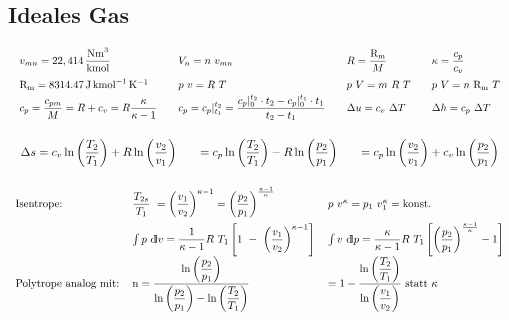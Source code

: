 \subsection{Ideales Gas}
%
	\skipabove{-20pt}
		\[ \arraycolsep=1em  \def\arraystretch{1.7}
		\begin{array}{llll}
			v_{mn}=22,414\, \dfrac{\si{Nm^3}}{\si{\kmol}}          & V_n = n\ v_{mn}                                                                               & R=\dfrac{\mathrm{R_m}}{M}       & \kappa = \dfrac{c_p}{c_v} \\
			\mathrm{R_m} = \qty{8314,47}{\J\per\kmol\per\K}        & p\ v=R\ T                                                                                     & p\ V = m\ R\ T         & p\ V=n\ \mathrm{R_m}\ T            \\
			c_p=\dfrac{c_{pm}}{M}=R+c_v=R \dfrac{\kappa}{\kappa-1} & c_p=c_p|_{t_1}^{t_2}  =   \dfrac{c_p|_{0}^{t_2}\cdot t_2 - c_p|_{0}^{t_1}\cdot t_1}{t_2- t_1} & \Delta u=c_v\ \Delta T & \Delta h=c_p\ \Delta T
		\end{array} \]
%
	\skipabove{-15pt}
		\[ \arraycolsep=1em  \def\arraystretch{2.7}
		\begin{array}{lll}
	  \Delta s = c_v \ln\left( \dfrac{T_2}{T_1}\right) + R \ln\left( \dfrac{v_2}{v_1}\right)
			&  = c_p \ln\left( \dfrac{T_2}{T_1}\right) - R \ln\left( \dfrac{p_2}{p_1}\right)
			&  = c_p \ln\left( \dfrac{v_2}{v_1}\right) + c_v \ln\left( \dfrac{p_2}{p_1}\right)
		\end{array} \]

	\skipabove{-10pt}
		\[ \arraycolsep=0.6em  \def\arraystretch{2.7}
		\begin{array}{lll}
			\text{Isentrope:}
			& \dfrac{T_{2s}}{T_1}\   =  \left(\dfrac{v_1}{v_2}\right)^{\kappa-1}  =
				\left(\dfrac{p_2}{p_1}\right)^\frac{\kappa-1}{\kappa}
			& p\ v^\kappa  =  p_1\ v_1^\kappa  =  \text{konst.}
		\\
			& \int p\ \dd v = \dfrac{1}{\kappa - 1}  R \ T_1
				\left[1\ -\ \left(\dfrac{v_1}{v_2}\right)^{\kappa-1}\right]
			& \int v\ \dd p = \dfrac{\kappa}{\kappa-1}  R \ T_1
				\left[\left(\dfrac{p_2}{p_1}\right)^\frac{\kappa-1}{\kappa}-1\right]
		\\
			\text{Polytrope analog mit:}
			&  \text{n} = \dfrac{
				\ln\left(\dfrac{p_2}{p_1}\right)} {
				\ln\left(\dfrac{p_2}{p_1}\right) -
				\ln\left(\dfrac{T_2}{T_1}\right)}
			&  = 1 - \dfrac{
				\ln\left(\dfrac{T_2}{T_1}\right)} {
				\ln\left(\dfrac{v_1}{v_2}\right)} \text{ statt } \kappa
		\end{array} \]

